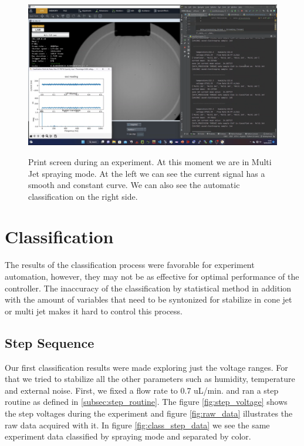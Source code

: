 \begin{figure}[H]
    \center
    {\includegraphics[width=16cm]{Figuras/19:03/axs2.png}}
    \caption{Print screen during an experiment. At this moment we are in Multi Jet spraying mode. At the left we can see the current signal has a smooth and constant curve. We can also see the automatic classification on the right side.}
    \label{fig:multi_class_exp}
\end{figure}


\section{Classification}
\label{sec:classification_results}

The results of the classification process were favorable for experiment automation, however, they may not be as effective for optimal performance of the controller.
The inaccuracy of the classification by statistical method in addition with the amount of variables that need to be syntonized for stabilize in cone jet or multi jet makes it hard to control this process.

\subsection{Step Sequence}
\label{subsec:step_results}

Our first classification results were made exploring just the voltage ranges. For that we tried to stabilize all the other parameters such as humidity, temperature and external noise.
First, we fixed a flow rate to 0.7 uL/min. and ran a step routine as defined in \ref{subsec:step_routine}. The figure \ref{fig:step_voltage} shows the step voltages during the experiment and figure \ref{fig:raw_data} illustrates the raw data acquired with it. In figure \ref{fig:class_step_data} we see the same experiment data classified by spraying mode and separated by color.


